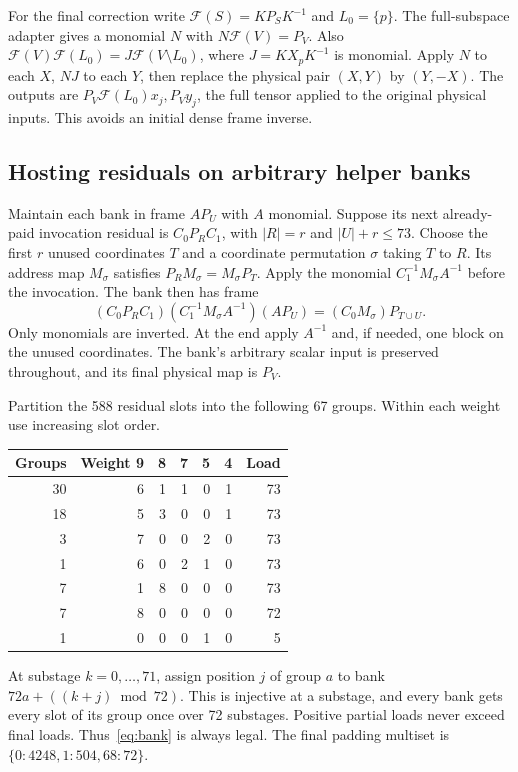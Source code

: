 \documentclass[11pt]{amsart}
\theoremstyle{remark}
\begin{document}
For the final correction write $\mathcal F(S)=KP_SK^{-1}$ and
$L_0=\{p\}$. The full-subspace adapter gives a monomial $N$ with
$N\mathcal F(V)=P_V$. Also
$\mathcal F(V)\mathcal F(L_0)=J\mathcal F(V\setminus L_0)$,
where $J=KX_pK^{-1}$ is monomial. Apply $N$ to each $X$, $NJ$ to each
$Y$, then replace the physical pair $(X,Y)$ by $(Y,-X)$. The outputs
are $P_V\mathcal F(L_0)x_j,P_Vy_j$, the full tensor applied to the
original physical inputs. This avoids an initial dense frame inverse.

\subsection{Hosting residuals on arbitrary helper banks}
Maintain each bank in frame $AP_U$ with $A$ monomial. Suppose its next
already-paid invocation residual is $C_0P_RC_1$, with $|R|=r$ and
$|U|+r\le73$. Choose the first $r$ unused coordinates $T$ and a
coordinate permutation $\sigma$ taking $T$ to $R$. Its address map
$M_\sigma$ satisfies $P_RM_\sigma=M_\sigma P_T$. Apply the monomial
$C_1^{-1}M_\sigma A^{-1}$ before the invocation. The bank then has frame
\begin{equation}\label{eq:bank}
 (C_0P_RC_1)(C_1^{-1}M_\sigma A^{-1})(AP_U)
       =(C_0M_\sigma)P_{T\cup U}.
\end{equation}
Only monomials are inverted. At the end apply $A^{-1}$ and, if needed,
one block on the unused coordinates. The bank's arbitrary scalar input
is preserved throughout, and its final physical map is $P_V$.

Partition the 588 residual slots into the following 67 groups. Within
each weight use increasing slot order.
\begin{center}\small
\begin{tabular}{rrrrrrr}
\toprule
Groups & Weight 9 & 8 & 7 & 5 & 4 & Load\\\midrule
30&6&1&1&0&1&73\\
18&5&3&0&0&1&73\\
3&7&0&0&2&0&73\\
1&6&0&2&1&0&73\\
7&1&8&0&0&0&73\\
7&8&0&0&0&0&72\\
1&0&0&0&1&0&5\\\bottomrule
\end{tabular}
\end{center}
At substage $k=0,\ldots,71$, assign position $j$ of group $a$ to bank
$72a+((k+j)\bmod72)$. This is injective at a substage, and every bank
gets every slot of its group once over 72 substages. Positive partial
loads never exceed final loads. Thus~\eqref{eq:bank} is always legal.
The final padding multiset is $\{0:4248,1:504,68:72\}$.
\end{document}
